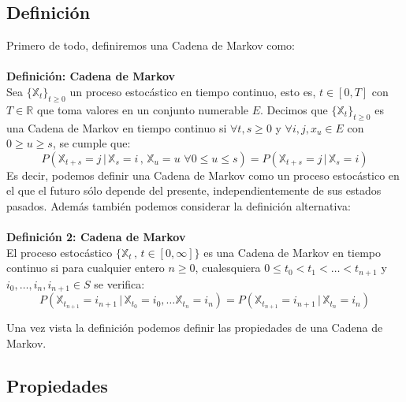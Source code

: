 \documentclass[12pt,a4paper]{article}
\begin{document}
\subsection{Definición}
Primero de todo, definiremos una Cadena de Markov como:
\\\\
\textbf{Definición: Cadena de Markov}
\\
Sea $\{\mathbb{X}_t\}_{t\geq 0}$ un proceso estocástico en tiempo continuo, esto es, $t\in [0,T]$ con $T\in \mathbb{R}$ que toma valores en un conjunto numerable $E$. Decimos que $\{\mathbb{X}_t\}_{t\geq 0}$ es una Cadena de Markov en tiempo continuo si $\forall t,s\geq 0$ y $\forall i,j,x_u\in E$ con $0\geq u \geq s$, se cumple que:
$$P(\mathbb{X}_{t+s}=j \, | \, \mathbb{X}_s =i \, , \,  \mathbb{X}_u =  u \,\, \forall 0\leq u\leq s)=P(\mathbb{X}_{t+s}=j \, | \, \mathbb{X}_s = i)$$
Es decir, podemos definir una Cadena de Markov como un proceso estocástico	en el que el futuro sólo depende del presente, independientemente de sus estados pasados. Además también podemos considerar la definición alternativa:
\\\\
\textbf{Definición 2: Cadena de Markov}
\\
El proceso estocástico $\{\mathbb{X}_t \, , \, t\in [0,\infty]\}$ es una Cadena de Markov en tiempo continuo si para cualquier entero $n\geq 0$, cualesquiera $0\leq t_0 < t_1 < \ldots < t_{n+1}$ y $i_0,\ldots , i_n,i_{n+1}\in S$ se verifica:
$$P(\mathbb{X}_{t_{n+1}}=i_{n+1}\, | \, \mathbb{X}_{t_0}=i_0 , \ldots \mathbb{X}_{t_n}=i_n)=P(\mathbb{X}_{t_{n+1}}=i_{n+1}\, | \, \mathbb{X}_{t_n}=i_n)$$

Una vez vista la definición podemos definir las propiedades de una Cadena de Markov.
\subsection{Propiedades}
\end{document}
